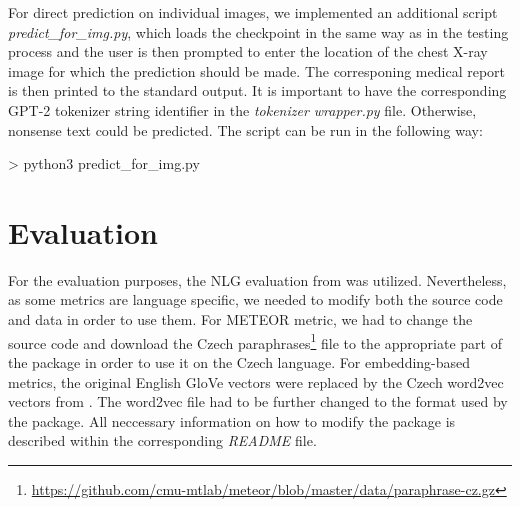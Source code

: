 For direct prediction on individual images, we implemented an additional script \textit{predict\_for\_img.py}, which loads the checkpoint in the same way as in the testing process and the user is then prompted to enter the location of the chest X-ray image for which the prediction should be made. The corresponing medical report is then printed to the standard output. It is important to have the corresponding GPT-2 tokenizer string identifier in the \textit{tokenizer wrapper.py} file. Otherwise, nonsense text could be predicted. The script can be run in the following way:
\begin{code}
> python3 predict_for_img.py
\end{code}

\section{Evaluation}
For the evaluation purposes, the NLG evaluation from \citet{sharma2017nlgeval} was utilized. Nevertheless, as some metrics are language specific, we needed to modify both the source code and data in order to use them. For METEOR metric, we had to change the source code and download the Czech paraphrases\footnote[6]{\url{https://github.com/cmu-mtlab/meteor/blob/master/data/paraphrase-cz.gz}} file to the appropriate part of the package in order to use it on the Czech language. For embedding-based metrics, the original English GloVe vectors were replaced by the Czech word2vec vectors from \citet{grave2018learning}. The word2vec file had to be further changed to the format used by the package. All neccessary information on how to modify the package is described within the corresponding \textit{README} file.
